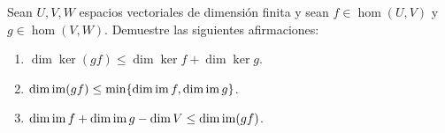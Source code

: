 \begin{xca}
    \label{xca:Silvester}
    Sean $U,V,W$ espacios vectoriales de dimensión finita y sean
    $f\in\hom(U,V)$ y $g\in\hom(V,W)$. Demuestre las siguientes afirmaciones:
    \begin{enumerate}
        \item $\dim\ker(gf)\leq\dim\ker f+\dim\ker g$.
        \item $\dim\operatorname{im}(gf)\leq\min\{\dim\operatorname{im} f,\dim\operatorname{im} g\}$.
        \item $\dim\operatorname{im} f+\dim\operatorname{im} g-\dim V\leq \dim\operatorname{im}(gf)$.
    \end{enumerate}
\end{xca}

%
%
%
%
%
